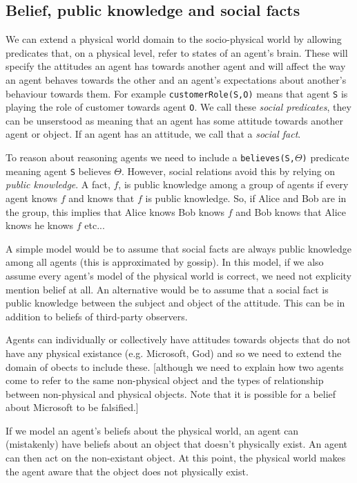 \documentclass[a4paper]{article}
\begin{document}
\subsection{Belief, public knowledge and social facts}

We can extend a physical world domain to the socio-physical world by allowing predicates that, on a physical level, refer to states of an agent's brain. These will specify the attitudes an agent has towards another agent and will affect the way an agent behaves towards the other and an agent's expectations about another's behaviour towards them. For example \texttt{customerRole(S,O)} means that agent \texttt{S} is playing the role of customer towards agent \texttt{O}. We call these \textit{social predicates}, they can be unserstood as meaning that an agent has some attitude towards another agent or object. If an agent has an attitude, we call that a \textit{social fact}.


To reason about reasoning agents we need to include a \texttt{believes(S,$\Theta$)} predicate meaning agent \texttt{S} believes $\Theta$. However, social relations avoid this by relying on \textit{public knowledge}. A fact, $f$, is public knowledge among a group of agents if every agent knows $f$ and knows that $f$ is public knowledge. So, if Alice and Bob are in the group, this implies that Alice knows Bob knows $f$ and Bob knows that Alice knows he knows $f$ etc...

A simple model would be to assume that social facts are always public knowledge among all agents (this is approximated by gossip). In this model, if we also assume every agent's model of the physical world is correct, we need not explicity mention belief at all. An alternative would be to assume that a social fact is public knowledge between the subject and object of the attitude. This can be in addition to beliefs of third-party observers.

Agents can individually or collectively have attitudes towards objects that do not have any physical existance (e.g. Microsoft, God) and so we need to extend the domain of obects to include these. [although we need to explain how two agents come to refer to the same non-physical object and the types of relationship between non-physical and physical objects. Note that it is possible for a belief about Microsoft to be falsified.] 

If we model an agent's beliefs about the physical world, an agent can (mistakenly) have beliefs about an object that doesn't physically exist. An agent can then act on the non-existant object. At this point, the physical world makes the agent aware that the object does not physically exist.
\end{document}
